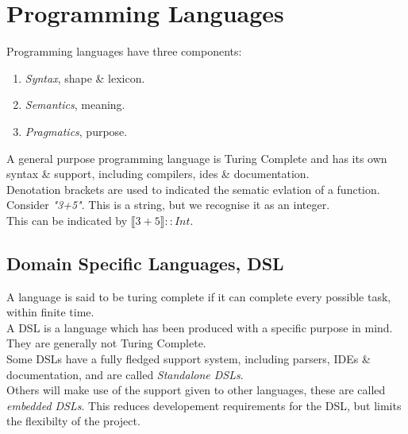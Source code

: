 \documentclass[11pt,a4paper]{article}
\begin{document}
\fancyhead[R]{\today}

\tableofcontents

\newpage

\section{Programming Languages}

Programming languages have three components:
\begin{enumerate}
  \item \textit{Syntax}, shape \& lexicon.
  \item \textit{Semantics}, meaning.
  \item \textit{Pragmatics}, purpose.
\end{enumerate}

A general purpose programming language is Turing Complete and has its own syntax \& support, including compilers, ides \& documentation.\\

Denotation brackets are used to indicated the sematic evlation of a function.\\

Consider \textit{"3+5"}. This is a string, but we recognise it as an integer.\\
This can be indicated by $\llbracket 3+5 \rrbracket :: Int$.\\

\subsection{Domain Specific Languages, DSL}

A language is said to be turing complete if it can complete every possible task, within finite time.\\

A DSL is a language which has been produced with a specific purpose in mind. They are generally not Turing Complete.\\

Some DSLs have a fully fledged support system, including parsers, IDEs \& documentation, and are called \textit{Standalone DSLs}.\\
Others will make use of the support given to other languages, these are called \textit{embedded DSLs}. This reduces developement requirements for the DSL, but limits the flexibilty of the project.\\
\end{document}
